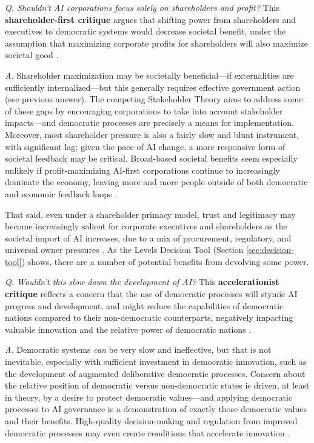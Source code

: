\documentclass{article}
\begin{document}
    \textit{Q. Shouldn't AI corporations focus solely on shareholders and profit?} 
    This \textbf{shareholder-first critique} argues that shifting power from shareholders and executives to democratic systems would decrease societal benefit, under the assumption that maximizing corporate profits for shareholders will also maximize societal good \cite{Friedman1970}.
    
    \textit{A.} Shareholder maximization may be societally beneficial---if externalities are sufficiently internalized---but this generally requires effective government action (see previous answer).
    The competing Stakeholder Theory aims to address some of these gaps \cite{freeman1984,mahajan2023} by encouraging corporations to take into account stakeholder impacts---and democratic processes are precisely a means for implementation. 
    Moreover, most shareholder pressure is also a fairly slow and blunt instrument, with significant lag; given the pace of AI change, a more responsive form of societal feedback may be critical. Broad-based societal benefits seem especially unlikely if profit-maximizing AI-first corporations continue to increasingly dominate the economy, leaving more and more people outside of both democratic and economic feedback loops \cite{kulveit2025}. 
    
    That said, even under a shareholder primacy model, trust and legitimacy may become increasingly salient for corporate executives and shareholders as the societal import of AI increases, due to a mix of procurement, regulatory, and universal owner pressures \cite{hawley2000,mattison2011universal,docherty2024universal}. 
    As the Levels Decision Tool (Section \ref{sec:decision-tool}) shows, there are a number of potential benefits from devolving some power. 

    \textit{Q. Wouldn't this slow down the development of AI?} This \textbf{accelerationist critique} reflects a concern that the use of democratic processes will stymie AI progress and development, and might reduce the capabilities of democratic nations compared to their non-democratic counterparts, negatively impacting valuable innovation and the relative power of democratic nations \cite{USCC2024,andreessen2023technooptimist}.

    \textit{A.} Democratic systems \textit{can} be very slow and ineffective, but that is not inevitable, especially with sufficient investment in democratic innovation, such as the development of augmented deliberative democratic processes. Concern about the relative position of democratic versus non-democratic states is driven, at least in theory, by a desire to protect democratic values---and applying democratic processes to AI governance is a demonstration of exactly those democratic values and their benefits. High-quality decision-making and regulation from improved democratic processes may even create conditions that accelerate innovation \cite{bradford2024false}.
\end{document}
